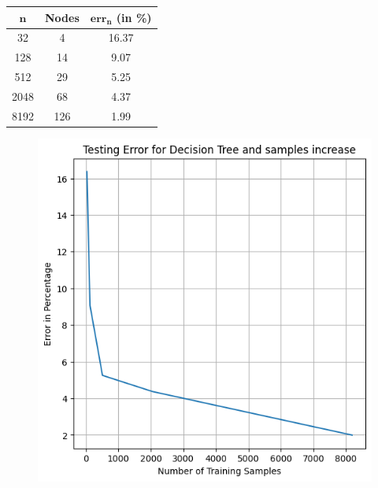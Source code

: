 \documentclass[a4paper]{article}
\theoremstyle{definition}
\newenvironment{soln}{
    \leavevmode\color{blue}\ignorespaces
}{}
\begin{document}
\begin{enumerate}
\begin{itemize}
  \begin{soln}
    \begin{minipage}{0.3\linewidth}
        \begin{tabular}{|c|c|c|}
              \hline
              $\mathbf{n}$ & \textbf{Nodes} & $\mathbf{err_n }$ (in \%) \\
              \hline
              32 & 4 & 16.37 \\
              128 & 14 & 9.07 \\
              512 & 29 & 5.25 \\
              2048 & 68 & 4.37 \\
              8192 & 126 & 1.99 \\
              \hline
          \end{tabular}
    \end{minipage}
    \begin{minipage}{0.7\linewidth}
        \begin{figure}[H]
            \centering
            \includegraphics[scale=0.4]{Images/Q7/DTq7_error.png}
            \label{fig:q7_error}
        \end{figure}
    \end{minipage}


\end{soln}
\end{itemize}
\end{enumerate}
\end{document}
